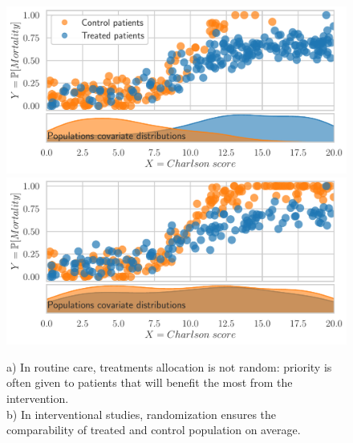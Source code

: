 \documentclass[french,12pt,twoside,a4paper]{book}
\begin{document}
\begin{figure}[!h]
  \begin{minipage}{0.32\textwidth}
    \caption{a) In routine care, treatments allocation is not random: priority
      is often given to patients that will benefit the most from the
      intervention.\\ b) In interventional studies, randomization ensures the
      comparability of treated and control population on average.
      \label{intro:fig:observational_vs_interventional}
    }
  \end{minipage}
  \hfill
  \begin{minipage}{0.65\textwidth}
    {\sffamily\footnotesize{}}
    \vfill%
    \includegraphics[width=0.92\linewidth]{img/chapter_1/sample.pdf}%
    \vfill%
    {\sffamily\footnotesize{}}
    \vfill%
    \includegraphics[width=0.92\linewidth]{img/chapter_1/sample_rct.pdf}%
  \end{minipage}
\end{figure}
\end{document}
